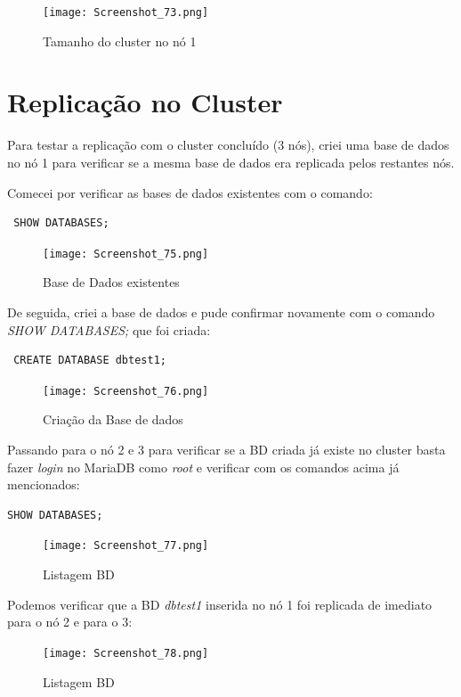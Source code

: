 \begin{figure}[H]
\center
\texttt{[image: Screenshot\_73.png]}
\caption{Tamanho do cluster no nó 1}
\end{figure}

\newpage
\section{Replicação no Cluster}

Para testar a replicação com o cluster concluído (3 nós), criei uma base de dados no nó 1 para verificar se a mesma base de dados era replicada pelos restantes nós. 

Comecei por verificar as bases de dados existentes com o comando:

\begin{verbatim} SHOW DATABASES; \end{verbatim}

\begin{figure}[H]
\center
\texttt{[image: Screenshot\_75.png]}
\caption{Base de Dados existentes}
\end{figure}

De seguida, criei a base de dados e pude confirmar novamente com o comando \textit{ SHOW DATABASES;} que foi criada:

\begin{verbatim} CREATE DATABASE dbtest1; \end{verbatim}

\begin{figure}[H]
\center
\texttt{[image: Screenshot\_76.png]}
\caption{Criação da Base de dados}
\end{figure}

\newpage
Passando para o nó 2 e 3 para verificar se a \ac{BD} criada já existe no cluster basta fazer \textit{login} no MariaDB como \textit{root} e verificar com os comandos acima já mencionados:

\begin{verbatim}SHOW DATABASES;\end{verbatim}

\begin{figure}[H]
\center
\texttt{[image: Screenshot\_77.png]}
\caption{Listagem \ac{BD}}
\end{figure}

Podemos verificar que a \ac{BD} \textit{dbtest1} inserida no nó 1 foi replicada de imediato para o nó 2 e para o 3:

\begin{figure}[H]
\center
\texttt{[image: Screenshot\_78.png]}
\caption{Listagem \ac{BD}}
\end{figure}

